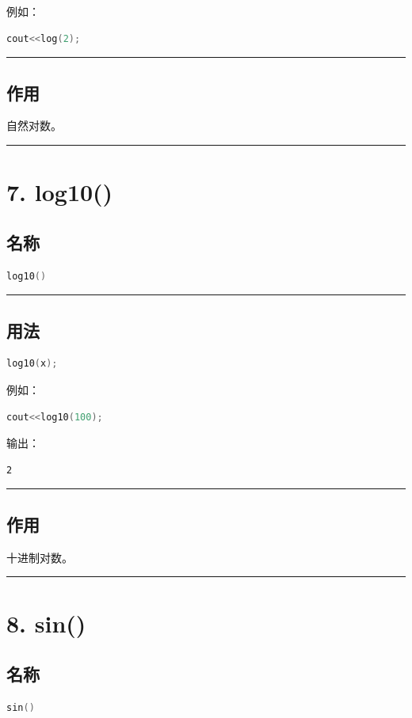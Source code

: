 \documentclass[9pt,twocolumn]{extarticle}
\begin{document}
例如：
\begin{lstlisting}[language=C++]
cout<<log(2);
\end{lstlisting}

\noindent\rule{\linewidth}{0.4pt}

\subsection{作用}
自然对数。

\noindent\rule{\linewidth}{0.4pt}

\section{7. log10()}

\subsection{名称}
\begin{lstlisting}[language=C++]
log10()
\end{lstlisting}

\noindent\rule{\linewidth}{0.4pt}

\subsection{用法}
\begin{lstlisting}[language=C++]
log10(x);
\end{lstlisting}
例如：
\begin{lstlisting}[language=C++]
cout<<log10(100);
\end{lstlisting}
输出：
\begin{lstlisting}
2
\end{lstlisting}

\noindent\rule{\linewidth}{0.4pt}

\subsection{作用}
十进制对数。

\noindent\rule{\linewidth}{0.4pt}

\section{8. sin()}

\subsection{名称}
\begin{lstlisting}[language=C++]
sin()
\end{lstlisting}
\end{document}
